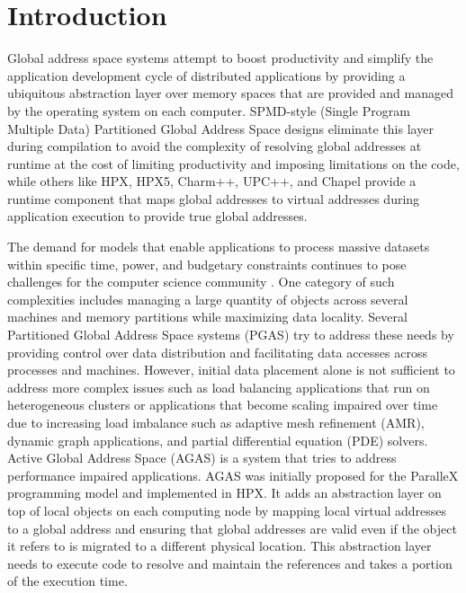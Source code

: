 \section{Introduction}
Global address space systems attempt to boost productivity and simplify the
application development cycle of distributed applications by providing a
ubiquitous abstraction layer over memory spaces that are provided and managed
by the operating system on each computer. SPMD-style (Single Program Multiple
Data) Partitioned Global Address Space designs eliminate this layer during
compilation to avoid the complexity of resolving global addresses at runtime at
the cost of limiting productivity and imposing limitations on the code, while
others like HPX\cite{Kaiser2014,hpx_repo}, HPX5\cite{hpx5},
Charm++\cite{Kale1993}, UPC++\cite{Zheng2014}, and Chapel\cite{chapel_lang} provide a
runtime component that maps global addresses to virtual addresses during
application execution to provide true global addresses.


The demand for models that enable applications to process massive
datasets within specific time, power, and budgetary constraints continues to
pose challenges for the computer science community
\cite{Amarasinghe091exascale,Sterling2009}. One category of such complexities
includes managing a large quantity of objects across several machines and
memory partitions while maximizing data locality. Several Partitioned Global
Address Space systems (PGAS) \cite{pgasorg} try to address these needs by
providing control over data distribution and facilitating data accesses across
processes and machines. However, initial data placement alone is not sufficient
to address more complex issues such as load balancing applications that run on heterogeneous clusters or applications
that become scaling impaired over time due to increasing load imbalance such
as adaptive mesh refinement (AMR), dynamic graph applications, and partial
differential equation (PDE) solvers\cite{5364511,Anderson2011a,Dekate2011}.
Active Global Address Space (AGAS) is a system that tries to address
performance impaired applications. AGAS was initially proposed for the ParalleX
programming model\cite{5364511} and implemented in HPX. It adds an abstraction
layer on top of local objects on each computing node by mapping local virtual
addresses to a global address and ensuring that global addresses are valid even
if the object it refers to is migrated to a different physical location. This
abstraction layer needs to execute code to resolve and maintain the references
and takes a portion of the execution time.


